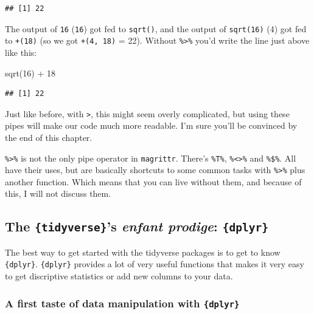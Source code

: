 \documentclass[
]{article}
\newenvironment{Shaded}{\begin{snugshade}}{\end{snugshade}}
\newcommand{\DecValTok}[1]{\textcolor[rgb]{0.00,0.00,0.81}{#1}}
\newcommand{\FunctionTok}[1]{\textcolor[rgb]{0.00,0.00,0.00}{#1}}
\newcommand{\NormalTok}[1]{#1}
\newcommand{\SpecialCharTok}[1]{\textcolor[rgb]{0.00,0.00,0.00}{#1}}
\begin{document}
\begin{verbatim}
## [1] 22
\end{verbatim}

The output of \texttt{16} (\texttt{16}) got fed to \texttt{sqrt()}, and the output of \texttt{sqrt(16)} (4) got fed to \texttt{+(18)}
(so we got \texttt{+(4,\ 18)} = 22). Without \texttt{\%\textgreater{}\%} you'd write the line just above like this:

\begin{Shaded}
\begin{Highlighting}[]
\FunctionTok{sqrt}\NormalTok{(}\DecValTok{16}\NormalTok{) }\SpecialCharTok{+} \DecValTok{18}
\end{Highlighting}
\end{Shaded}

\begin{verbatim}
## [1] 22
\end{verbatim}

Just like before, with \texttt{\textbar{}\textgreater{}}, this might seem overly complicated, but using these pipes will
make our code much more readable. I'm sure you'll be convinced by the end of this chapter.

\texttt{\%\textgreater{}\%} is not the only pipe operator in \texttt{magrittr}. There's \texttt{\%T\%}, \texttt{\%\textless{}\textgreater{}\%} and \texttt{\%\$\%}. All have their
uses, but are basically shortcuts to some common tasks with \texttt{\%\textgreater{}\%} plus another function. Which
means that you can live without them, and because of this, I will not discuss them.

\hypertarget{the-tidyverses-enfant-prodige-dplyr}{%
\subsection{\texorpdfstring{The \texttt{\{tidyverse\}}'s \emph{enfant prodige}: \texttt{\{dplyr\}}}{The \{tidyverse\}'s enfant prodige: \{dplyr\}}}\label{the-tidyverses-enfant-prodige-dplyr}}

The best way to get started with the tidyverse packages is to get to know \texttt{\{dplyr\}}. \texttt{\{dplyr\}}
provides a lot of very useful functions that makes it very easy to get discriptive statistics or
add new columns to your data.

\hypertarget{a-first-taste-of-data-manipulation-with-dplyr}{%
\subsubsection{\texorpdfstring{A first taste of data manipulation with \texttt{\{dplyr\}}}{A first taste of data manipulation with \{dplyr\}}}\label{a-first-taste-of-data-manipulation-with-dplyr}}
\end{document}
